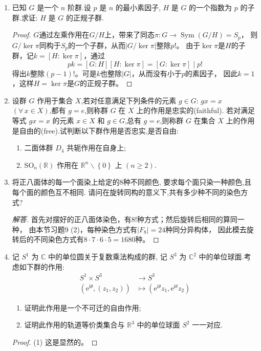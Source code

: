\begin{enumerate}
\item 已知 $G$ 是一个 $n$ 阶群.设 $p$ 是 $n$ 的最小素因子, $H$ 是 $G$ 的一个指数为 $p$ 的子群.求证: $H$ 是 $G$ 的正规子群.
\begin{proof}
    $G$通过左乘作用在$G/H$上，带来了同态$\pi:G\to\operatorname{Sym}(G/H)=S_p$，
    则$G/\ker\pi$同构于$S_p$的一个子群，从而$|G/\ker\pi|$整除$p!$。
    由于$\ker\pi$是$H$的子群，记$k=[H:\ker\pi]$，通过
    \[pk=[G:H][H:\ker\pi]=[G:\ker\pi] \mid p!\]
    得出$k$整除$(p-1)!$。可是$k$也整除$|G|$，从而没有小于$p$的素因子，
    因此$k=1$，这样$H=\ker\pi$是$G$的正规子群。
\end{proof}
\item 设群 $G$ 作用于集合 $X$,若对任意满足下列条件的元素 $g \in G$: $gx = x$ $(\forall\, x \in X)$,都有 $g = e$,则称群 $G$ 在 $X$ 上的作用是忠实的(faithful).
若对满足等式 $gx = x$ 的元素 $x \in X$ 和 $g \in G$,总有 $g = e$,则称群 $G$ 在集合 $X$ 上的作用是自由的(free).试判断以下群作用是否忠实,是否自由:
\begin{enumerate}[label=(\arabic*)]
\item 二面体群 $D_4$ 共轭作用在自身上;
\item $\mathrm{SO}_{n}(\mathbb{R})$ 作用在 $\mathbb{R}^n \backslash \left\{0\right\}$ 上 $(n \geqslant 2)$.
\end{enumerate}
\item 将正八面体的每一个面染上给定的$8$种不同颜色,
要求每个面只染一种颜色,且每个面的颜色互不相同.
请问在旋转同构的意义下,共有多少种不同的染色方式?
\begin{proof}[解答]
    首先对摆好的正八面体染色，有$8!$种方式；然后旋转后相同的算同一种，
    由本节习题9 (2)，每种染色方式有$|F_8|=24$种同分异构体，
    因此模去旋转后的不同染色方式有$8\cdot7\cdot6\cdot5=1680$种。
\end{proof}
\item 记 $S^1$ 为 $\mathbb{C}$ 中的单位圆关于复数乘法构成的群,
记 $S^3$ 为 $\mathbb{C}^2$ 中的单位球面.考虑如下群的作用:
\[
\begin{aligned}
S^1 \times S^3 & \rightarrow S^3 \\
\left(\mathrm{e}^{\mathrm{i} \theta},\left(z_1, z_2\right)\right) & \mapsto\left(\mathrm{e}^{\mathrm{i} \theta} z_1, \mathrm{e}^{\mathrm{i} \theta} z_2\right)
\end{aligned}
\]
\begin{enumerate}[label=(\arabic*)]
\item 证明此作用是一个不可迁的自由作用;
\item 证明此作用的轨道等价类集合与 $\mathbb{R}^3$ 中的单位球面 $S^2$ 一一对应.
\end{enumerate}
\begin{proof}
    (1) 这是显然的。


\end{proof}
\end{enumerate}
